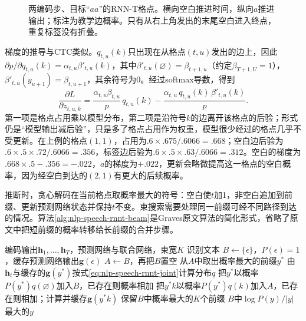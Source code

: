 \begin{figure}[htbp]
  \centering
  
  \caption{两编码步、目标“$aa$”的RNN-T格点。横向空白推进时间，纵向$a$推进输出；标注为教学边概率。只有从右上角发出的末尾空白进入终点，重复标签没有折叠。}
  \label{fig:nlp-speech-rnnt-lattice}
\end{figure}

梯度的推导与CTC类似。$q_{t,u}(k)$只出现在从格点$(t,u)$发出的边上，因此$\partial p/\partial q_{t,u}(k)=\alpha_{t,u}\beta'_{t,u}(k)$，其中$\beta'_{t,u}(\varnothing)=\beta_{t+1,u}$（约定$\beta_{T+1,U}=1$），$\beta'_{t,u}(y_{u+1})=\beta_{t,u+1}$，其余符号为0。经过softmax导数，得到
\begin{equation}
 \frac{\partial L}{\partial z_{t,u,k}}
 =\frac{\alpha_{t,u}\beta_{t,u}}{p}\,q_{t,u}(k)
  -\frac{\alpha_{t,u}\,q_{t,u}(k)\,\beta'_{t,u}(k)}{p}.
 \label{eq:nlp-speech-rnnt-gradient}
\end{equation}
第一项是格点占用乘以模型分布，第二项是沿符号$k$的边离开该格点的后验；形式仍是“模型输出减后验”，只是多了格点占用作为权重，模型很少经过的格点几乎不受更新。在上例的格点$(1,1)$，占用为$.6\times.675/.6066=.668$；空白边后验为$.6\times.5\times.72/.6066=.356$，标签边后验为$.6\times.5\times.63/.6066=.312$。空白的梯度为$.668\times.5-.356=-.022$，$a$的梯度为$+.022$，更新会略微提高这一格点的空白概率，因为经空白到达的$(2,1)$有更大的后续概率。

推断时，贪心解码在当前格点取概率最大的符号：空白使$t$加1，非空白追加到前缀、更新预测网络状态并保持$t$不变。束搜索需要处理同一前缀可经不同路径到达的情况。算法\ref{alg:nlp-speech-rnnt-beam}是Graves原文算法的简化形式，省略了原文中把短前缀的概率转移给长前缀的合并步骤。

\begin{algorithm}
  \label{alg:nlp-speech-rnnt-beam}
  \begin{algorithmic}[1]
    \Require 编码输出$\bm{h}_1,\ldots,\bm{h}_T$，预测网络与联合网络，束宽$K$
    \Ensure 识别文本
    \State $B\gets\{\epsilon\}$，$P(\epsilon)=1$，缓存预测网络输出$\bm{g}(\epsilon)$
      \State $A\gets B$，再把$B$置空
        \State 从$A$中取出概率最大的前缀$y^*$
        \State 由$\bm{h}_t$与缓存的$\bm{g}(y^*)$按式\eqref{eq:nlp-speech-rnnt-joint}计算分布$q$
        \State 把$y^*$以概率$P(y^*)q(\varnothing)$加入$B$，已存在则概率相加 
          \State 把$y^*k$以概率$P(y^*)q(k)$加入$A$，已存在则相加；计算并缓存$\bm{g}(y^*k)$
        \EndFor
      \EndWhile
      \State 保留$B$中概率最大的$K$个前缀
    \EndFor
    \State \Return $B$中$\log P(y)/|y|$最大的$y$
  \end{algorithmic}
\end{algorithm}

